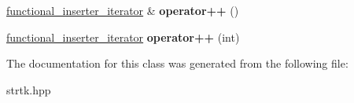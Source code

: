 \begin{DoxyCompactItemize}
\item 
\hypertarget{classstrtk_1_1functional__inserter__iterator_a6da88e0fe992652fb1d47394d645aa71}{\hyperlink{classstrtk_1_1functional__inserter__iterator}{functional\-\_\-inserter\-\_\-iterator} \& {\bfseries operator++} ()}\label{classstrtk_1_1functional__inserter__iterator_a6da88e0fe992652fb1d47394d645aa71}

\item 
\hypertarget{classstrtk_1_1functional__inserter__iterator_a25bda9f590b6d5023d366eabf8adda7a}{\hyperlink{classstrtk_1_1functional__inserter__iterator}{functional\-\_\-inserter\-\_\-iterator} {\bfseries operator++} (int)}\label{classstrtk_1_1functional__inserter__iterator_a25bda9f590b6d5023d366eabf8adda7a}

\end{DoxyCompactItemize}


The documentation for this class was generated from the following file\-:\begin{DoxyCompactItemize}
\item 
strtk.\-hpp\end{DoxyCompactItemize}
